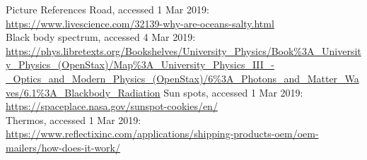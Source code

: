 \documentclass{beamer}
\begin{document}
\begin{frame}{Picture References}
\tiny
Road, accessed 1 Mar 2019: \href{https://www.livescience.com/32139-why-are-oceans-salty.html}{https://www.livescience.com/32139-why-are-oceans-salty.html}\\
Black body spectrum, accessed 4 Mar 2019: \href{https://phys.libretexts.org/Bookshelves/University_Physics/Book\%3A_University_Physics_(OpenStax)/Map\%3A_University_Physics_III_-_Optics_and_Modern_Physics_(OpenStax)/6\%3A_Photons_and_Matter_Waves/6.1\%3A_Blackbody_Radiation}{https://phys.libretexts.org/Bookshelves/University\_Physics/Book\%3A\_University\_Physics\_(OpenStax)/Map\%3A\_University\_Physics\_III\_-\_Optics\_and\_Modern\_Physics\_(OpenStax)/6\%3A\_Photons\_and\_Matter\_Waves/6.1\%3A\_Blackbody\_Radiation}
Sun spots, accessed 1 Mar 2019: \href{https://spaceplace.nasa.gov/sunspot-cookies/en/}{https://spaceplace.nasa.gov/sunspot-cookies/en/}\\
Thermos, accessed 1 Mar 2019: \href{https://www.reflectixinc.com/applications/shipping-products-oem/oem-mailers/how-does-it-work/}{https://www.reflectixinc.com/applications/shipping-products-oem/oem-mailers/how-does-it-work/}\\
\end{frame}
\end{document}

